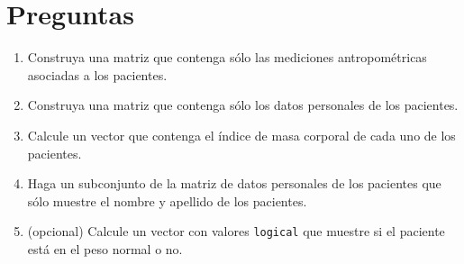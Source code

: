 \documentclass{article}
\begin{document}
\section{Preguntas}

\begin{enumerate}
    \item Construya una matriz que contenga sólo las mediciones antropométricas asociadas a los pacientes.
    \item Construya una matriz que contenga sólo los datos personales de los pacientes.
    \item Calcule un vector que contenga el índice de masa corporal de cada uno de los pacientes.
    \item Haga un subconjunto de la matriz de datos personales de los pacientes que sólo muestre el nombre y apellido de los pacientes.
    \item (opcional) Calcule un vector con valores \texttt{logical} que muestre si el paciente está en el peso normal o no.
\end{enumerate}
\end{document}
